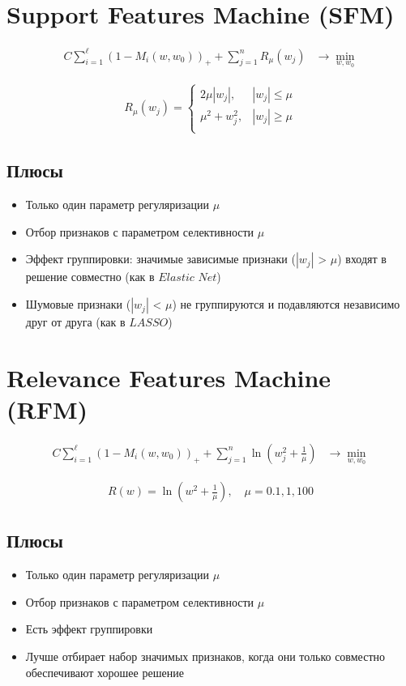 \section{Support Features Machine (SFM)}

\begin{align*}
    C \sum_{i=1}^{\ell} \left(1 - M_i(w, w_0)\right)_+ + \sum_{j=1}^{n} R_{\mu}(w_{j}) & \rightarrow \min_{w, w_0}
\end{align*}

\begin{align*}
    R_{\mu}(w_j)=
    \begin{cases}
        2\mu |w_j|,    & |w_j| \leq \mu \\
        \mu^2 + w_j^2, & |w_j| \geq \mu \\
    \end{cases}
\end{align*}

\subsection*{Плюсы}
\begin{itemize}
    \item Только один параметр регуляризации \(\mu\)
    \item Отбор признаков с параметром селективности \(\mu\)
    \item Эффект группировки: значимые зависимые признаки ($|w_j|$ > \(\mu\)) входят в решение совместно (как в $Elastic$ $Net$)
    \item Шумовые признаки ($|w_j|$ < \(\mu\)) не группируются и подавляются независимо друг от друга (как в $LASSO$)
\end{itemize}

\section{Relevance Features Machine (RFM)}

\begin{align*}
    C \sum_{i=1}^{\ell} \left(1 - M_i(w, w_0)\right)_+ + \sum_{j=1}^{n} \ln(w_j^2 + \frac{1}{\mu}) & \rightarrow \min_{w, w_0}
\end{align*}

\begin{align*}
    R(w) = \ln(w^2 + \frac{1}{\mu}), \quad \mu = 0.1, 1, 100
\end{align*}

\subsection*{Плюсы}
\begin{itemize}
    \item Только один параметр регуляризации \(\mu\)
    \item Отбор признаков с параметром селективности \(\mu\)
    \item Есть эффект группировки
    \item Лучше отбирает набор значимых признаков, когда они только совместно обеспечивают хорошее решение
\end{itemize}

